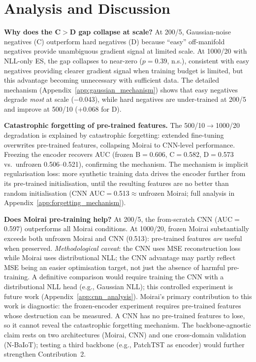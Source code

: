 \section{Analysis and Discussion}
\label{sec:analysis}

\textbf{Why does the C$>$D gap collapse at scale?}
At 200/5, Gaussian-noise negatives (C) outperform hard negatives (D)
because ``easy'' off-manifold negatives provide unambiguous gradient signal
at limited scale.  At 1000/20 with NLL-only ES, the gap collapses to
near-zero ($p{=}0.39$, n.s.), consistent with easy negatives providing clearer gradient signal when
training budget is limited, but this advantage becoming unnecessary
with sufficient data.
The detailed mechanism (Appendix~\ref{app:gaussian_mechanism}) shows that
easy negatives degrade \emph{most} at scale ($-$0.043), while hard negatives
are under-trained at 200/5 and improve at 500/10 ($+$0.068 for D).

\textbf{Catastrophic forgetting of pre-trained features.}
The 500/10$\to$1000/20 degradation is explained by catastrophic forgetting:
extended fine-tuning overwrites pre-trained features, collapsing Moirai
to CNN-level performance.
Freezing the encoder recovers AUC (frozen B$=$0.606, C$=$0.582, D$=$0.573
vs.\ unfrozen 0.506--0.521), confirming the mechanism.
The mechanism is implicit regularisation loss: more synthetic training data drives the encoder further from its pre-trained initialisation, until the resulting features are no better than random initialisation (CNN AUC$=$0.513$\approx$unfrozen Moirai; full analysis in Appendix~\ref{app:forgetting_mechanism}).

\textbf{Does Moirai pre-training help?}
At 200/5, the from-scratch CNN (AUC$=$0.597) outperforms all Moirai
conditions.
At 1000/20, frozen Moirai substantially exceeds both unfrozen Moirai
and CNN (0.513): pre-trained features \emph{are} useful when preserved.
\emph{Methodological caveat}: the CNN uses MSE reconstruction loss while
Moirai uses distributional NLL; the CNN advantage may partly reflect MSE
being an easier optimisation target, not just the absence of harmful
pre-training.  A definitive comparison would require training the CNN with a distributional
NLL head (e.g., Gaussian NLL); this controlled experiment is future work
(Appendix~\ref{app:cnn_analysis}).
Moirai's primary contribution to this work is diagnostic: the frozen-encoder
experiment requires pre-trained features whose destruction can be measured.
A CNN has no pre-trained features to lose, so it cannot reveal the
catastrophic forgetting mechanism.
The backbone-agnostic claim rests on two architectures (Moirai, CNN) and
one cross-domain validation (N-BaIoT); testing a third backbone
(e.g., PatchTST as encoder) would further strengthen Contribution~2.

